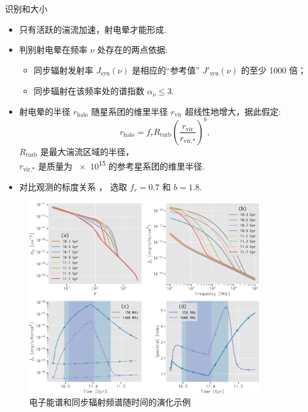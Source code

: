 \documentclass{beamer}
\newcommand{\R}[1]{\text{#1}}  %
\begin{document}
\begin{frame}{识别和大小}
  \begin{itemize}
    \item 只有活跃的湍流加速，射电晕才能形成.
    \item 判别射电晕在频率 $\nu$ 处存在的两点依据:
      \begin{itemize}
        \item 同步辐射发射率 $J_{\R{syn}}(\nu)$
          是相应的\enquote{参考值} $J'_{\R{syn}}(\nu)$ 的至少 1000 倍；
        \item 同步辐射在该频率处的谱指数 $\alpha_{\nu} \le 3$.
      \end{itemize}

    \item 射电晕的半径 $r_{\R{halo}}$ 随星系团的维里半径 $r_{\R{vir}}$
      超线性地增大，据此假定:
      \begin{equation}
        r_{\R{halo}} = f_r R_{\R{turb}}
          \left( \frac{r_{\R{vir}}}{r_{\R{vir,*}}} \right)^b ,
      \end{equation}
      $R_{\R{turb}}$ 是最大湍流区域的半径，\\
      $r_{\R{vir,*}}$ 是质量为 \SI{e15}{\solarmass} 的参考星系团的维里半径.
    \item 对比观测的标度关系 \cite{cassano2007}，
      选取 $f_r = 0.7$ 和 $b = 1.8$.
  \end{itemize}
\end{frame}

\begin{frame}
  \begin{figure}
    \centering
    \includegraphics[width=0.9\textwidth]{spec-evo-example}
    \caption{电子能谱和同步辐射频谱随时间的演化示例}
  \end{figure}
\end{frame}
\end{document}
